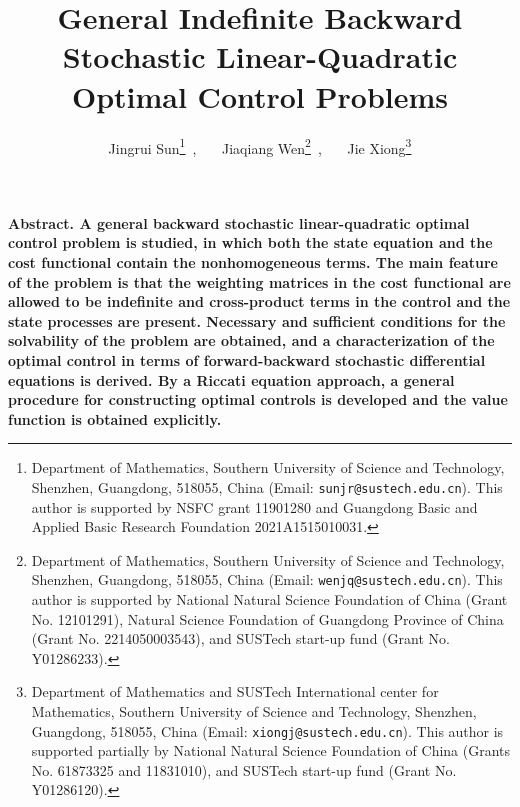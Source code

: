 \documentclass[11pt,times,twoside]{article}
\def\no{\noindent}        \def\q{\quad}                      \def\llan{\left\langle}
\begin{document}
\title{{\bf General Indefinite Backward Stochastic Linear-Quadratic Optimal Control Problems}
}

\author{Jingrui Sun\thanks{Department of Mathematics, Southern University of Science and Technology, Shenzhen, Guangdong, 518055, China
(Email: {\tt sunjr@sustech.edu.cn}). This author is supported by NSFC grant 11901280 and Guangdong Basic
and Applied Basic Research Foundation 2021A1515010031.}~,~~~
%
Jiaqiang Wen\thanks{Department of Mathematics, Southern University of Science and Technology, Shenzhen, Guangdong, 518055, China (Email: {\tt wenjq@sustech.edu.cn}).
This author is supported by National Natural Science Foundation of China (Grant No. 12101291), Natural Science Foundation of Guangdong Province of China (Grant No. 2214050003543), and SUSTech start-up fund (Grant No. Y01286233).}~,~~~
%
Jie Xiong\thanks{Department of Mathematics and SUSTech International center for Mathematics, Southern University of Science and Technology, Shenzhen, Guangdong, 518055, China (Email: {\tt xiongj@sustech.edu.cn}).
This author is supported partially by National Natural Science Foundation of China (Grants No. 61873325 and 11831010), and SUSTech start-up fund (Grant No. Y01286120).}}

\maketitle


\no\bf Abstract. \rm
A general backward stochastic linear-quadratic optimal control problem is studied, in which both the state equation and the cost functional contain the nonhomogeneous terms. The main feature of the problem is that the weighting matrices in the cost functional are allowed to be indefinite and cross-product terms in the control and the state processes are present. Necessary and sufficient conditions for the solvability of the problem are obtained, and a characterization of the optimal control in terms of forward-backward stochastic differential equations is derived. By a Riccati equation approach, a general procedure for constructing optimal controls is developed and the value function is obtained explicitly.
\end{document}
